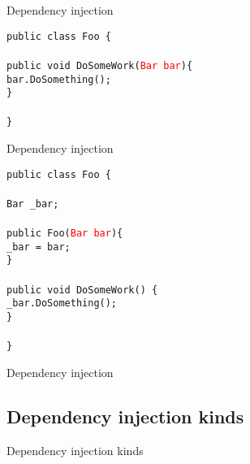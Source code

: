 \documentclass{beamer}
\newcommand{\code}[1]{{\texttt{#1}}}
\begin{document}
\begin{frame}{Dependency injection}
     \begin{large}
	\code{public class Foo \{}\\ \quad
	\code{}\\ \quad
		\code{public void DoSomeWork(\textcolor{red}{Bar bar})\{}\\ \qquad
		\code{bar.DoSomething();}\\ \quad
		\code{\}}\\
	\code{}\\
	\code{\}}
     \end{large}
\end{frame}

\begin{frame}{Dependency injection}
     \begin{large}
	\code{public class Foo \{}\\
	\code{}\\ \quad
		\code{Bar \_bar;}\\ \quad
	\code{}\\ \quad
		\code{public Foo(\textcolor{red}{Bar bar})\{}\\ \qquad
		\code{\_bar = bar;}\\ \quad
		\code{\}}\\ \quad
	\code{}\\ \quad
		\code{public void DoSomeWork() \{}\\ \qquad
		\code{\_bar.DoSomething();}\\ \quad
		\code{\}}\\
	\code{}\\
	\code{\}}
     \end{large}
\end{frame}

\begin{frame}{}
	\begin{center}
		\Large{Dependency injection}
	\end{center}
\end{frame}

\subsection*{Dependency injection kinds}

\begin{frame}{}
	\begin{center}
		\Large{Dependency injection kinds}
	\end{center}
\end{frame}
\end{document}
